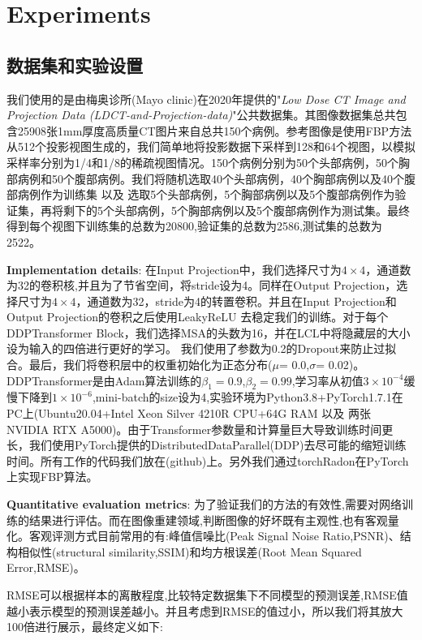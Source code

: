 \section{Experiments}
\subsection{数据集和实验设置}
我们使用的是由梅奥诊所(Mayo clinic)在2020年提供的"\emph{Low Dose CT Image and Projection Data (LDCT-and-Projection-data)}"\cite{moen2021low}公共数据集。其图像数据集总共包含25908张1mm厚度高质量CT图片来自总共150个病例。参考图像是使用FBP方法从512个投影视图生成的，我们简单地将投影数据下采样到128和64个视图，以模拟采样率分别为1/4和1/8的稀疏视图情况。150个病例分别为50个头部病例，50个胸部病例和50个腹部病例。我们将随机选取40个头部病例，40个胸部病例以及40个腹部病例作为训练集 以及 选取5个头部病例，5个胸部病例以及5个腹部病例作为验证集，再将剩下的5个头部病例，5个胸部病例以及5个腹部病例作为测试集。最终得到每个视图下训练集的总数为20800,验证集的总数为2586,测试集的总数为2522。\par
\textbf{Implementation details}: 在Input Projection中，我们选择尺寸为${4}\times{4}$，通道数为32的卷积核,并且为了节省空间，将stride设为4。同样在Output Projection，选择尺寸为${4}\times{4}$，通道数为32，stride为4的转置卷积。并且在Input Projection和Output Projection的卷积之后使用LeakyReLU\cite{2013Rectifier} 去稳定我们的训练。对于每个DDPTransformer Block，我们选择MSA的头数为16，并在LCL中将隐藏层的大小设为输入的四倍进行更好的学习。 我们使用了参数为0.2的Dropout\cite{2014Dropout}来防止过拟合。最后，我们将卷积层中的权重初始化为正态分布($\mu$= 0.0,$\sigma$= 0.02)。DDPTransformer是由Adam算法\cite{2014Adam}训练的$\beta_1=0.9$,$\beta_2=0.99$,学习率从初值$3\times10^{-4}$缓慢下降到$1 \times 10^{-6}$,mini-batch的size设为4,实验环境为Python3.8+PyTorch1.7.1在PC上(Ubuntu20.04+Intel Xeon Silver 4210R CPU+64G RAM 以及 两张 NVIDIA RTX A5000)。由于Transformer参数量和计算量巨大导致训练时间更长，我们使用PyTorch提供的DistributedDataParallel(DDP)去尽可能的缩短训练时间。所有工作的代码我们放在(github)上。另外我们通过torchRadon\cite{torch_radon}在PyTorch上实现FBP算法。\par
\textbf{Quantitative evaluation metrics}: 为了验证我们的方法的有效性,需要对网络训练的结果进行评估。而在图像重建领域,判断图像的好坏既有主观性,也有客观量化。客观评测方式目前常用的有:峰值信噪比(Peak Signal Noise Ratio,PSNR)、结构相似性(structural similarity,SSIM)和均方根误差(Root Mean Squared Error,RMSE)。\par
RMSE可以根据样本的离散程度,比较特定数据集下不同模型的预测误差,RMSE值越小表示模型的预测误差越小。并且考虑到RMSE的值过小，所以我们将其放大100倍进行展示，最终定义如下:
